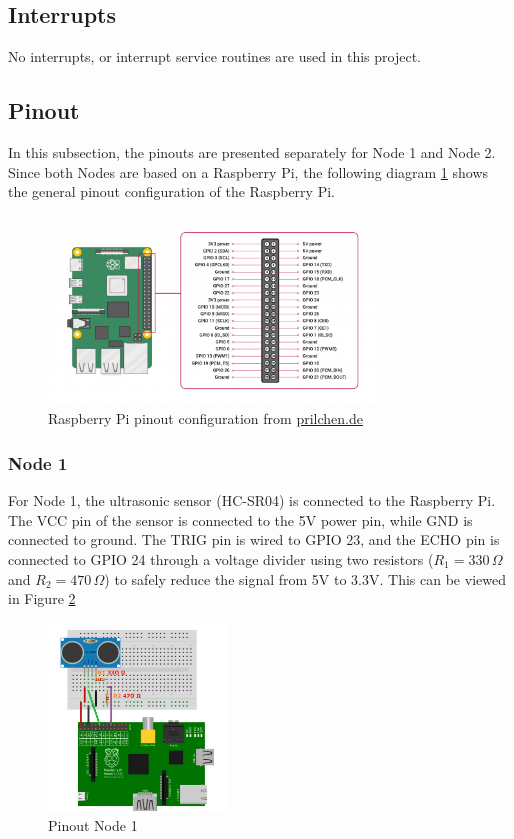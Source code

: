 \subsection{Interrupts}

No interrupts, or interrupt service routines are used in this project.

\subsection{Pinout}

In this subsection, the pinouts are presented separately for Node 1 and Node 2. Since both Nodes are based on a Raspberry Pi, the following diagram \ref{fig:raspi} shows the general pinout configuration of the Raspberry Pi.

\begin{figure}[h]
	\includegraphics[height=50mm]{images/GPIO-Pinout-Diagram-2.png}
	\centering
	\caption{Raspberry Pi pinout configuration from \href{https://prilchen.de/raspberry-pis-gpio-ein-tor-zu-unzaehligen-projekten/} {prilchen.de}}
	\label{fig:raspi}
\end{figure}

\subsubsection{Node 1}

For Node 1, the ultrasonic sensor (HC-SR04) is connected to the Raspberry Pi. The VCC pin of the sensor is connected to the 5V power pin, while GND is connected to ground. The TRIG pin is wired to GPIO 23, and the ECHO pin is connected to GPIO 24 through a voltage divider using two resistors ($R_1 = 330\,\Omega$ and $R_2 = 470\,\Omega$) to safely reduce the signal from 5V to 3.3V. This can be viewed in Figure \ref{fig:node1-pinout}


\begin{figure}[h]
	\includegraphics[height=50mm]{images/pinout_node1.png}
	\centering
	\caption{Pinout Node 1}
	\label{fig:node1-pinout}
\end{figure}

